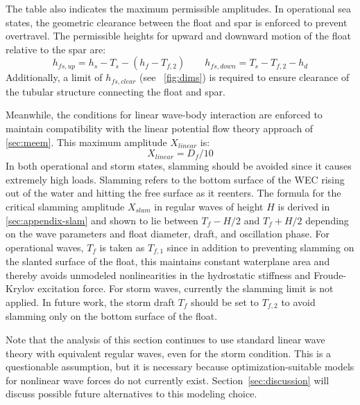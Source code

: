 The table also indicates the maximum permissible amplitudes.
In operational sea states, the geometric clearance between the float and spar is enforced to prevent overtravel.
The permissible heights for upward and downward motion of the float relative to the spar are:
\begin{equation}\label{eq:h-fs-up-down}
    h_{fs,up} = h_s - T_s - (h_f- T_{f,2})\qquad h_{fs,down} = T_s - T_{f,2} - h_d
\end{equation}
Additionally, a limit of $h_{fs,clear}$ (see \figureautorefname~\ref{fig:dims}) is required to ensure clearance of the tubular structure connecting the float and spar.

Meanwhile, the conditions for linear wave-body interaction are enforced to maintain compatibility with the linear potential flow theory approach of \ref{sec:meem}.
This maximum amplitude $X_{linear}$ is:
\begin{equation}
    X_{linear}  =D_f/10
\end{equation}
In both operational and storm states, slamming should be avoided since it causes extremely high loads.
Slamming refers to the bottom surface of the WEC rising out of the water and hitting the free surface as it reenters.
The formula for the critical slamming amplitude $X_{slam}$ in regular waves of height $H$ is derived in \appendixname \ref{sec:appendix-slam} and shown to lie between $T_f-H/2$ and $T_f+H/2$ depending on the wave parameters and float diameter, draft, and oscillation phase.
For operational waves, $T_f$ is taken as $T_{f,1}$ since in addition to preventing slamming on the slanted surface of the float, this maintains constant waterplane area and thereby avoids unmodeled nonlinearities in the hydrostatic stiffness and Froude-Krylov excitation force.
For storm waves, currently the slamming limit is not applied.
In future work, the storm draft $T_f$ should be set to $T_{f,2}$ to avoid slamming only on the bottom surface of the float.

Note that the analysis of this section continues to use standard linear wave theory with equivalent regular waves, even for the storm condition.
This is a questionable assumption, but it is necessary because optimization-suitable models for nonlinear wave forces do not currently exist.
Section~\ref{sec:discussion} will discuss possible future alternatives to this modeling choice.

